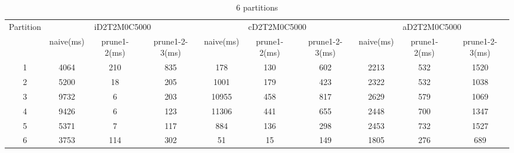 
\vspace*{50pt}
\begin{table*}[t]
  \centering
\makeatletter
    \long{}
\makeatother
  \caption{6 partitions}
    \vspace*{3pt}
  \footnotesize

  \label{table:partition6}
  \begin{tabular}{|c||c|c|c|c|c|c|c|c|c|}
  \hline
  \multirow{2}{*}{Partition} &  \multicolumn{3}{|c|}{iD2T2M0C5000} & \multicolumn{3}{|c|}{cD2T2M0C5000} &\multicolumn{3}{|c|}{aD2T2M0C5000} \\\cline{2-10}
    &  naive(ms) & prune1-2(ms) & prune1-2-3(ms) & naive(ms) & prune1-2(ms) & prune1-2-3(ms) & naive(ms) & prune1-2(ms) & prune1-2-3(ms) \\\hline \hline

\cline{2-10}
    1 &  4064 & 210 & 835 & 178 & 130 & 602 & 2213  & 532 & 1520 \\\hline

\cline{2-10}
    2 &  5200 & 18 & 205 & 1001 & 179 & 423 & 2322 & 532 & 1038 \\\hline

\cline{2-10}
    3 &  9732 & 6 & 203 & 10955 &  458 & 817 & 2629 & 579 & 1069 \\\hline
    
\cline{2-10}
    4 &  9426 & 6 & 123 & 11306 &  441& 655 & 2448 & 700 & 1347 \\\hline
    
\cline{2-10}
    5 &  5371 & 7 & 117 & 884 &  136 & 298 & 2453 & 732 & 1527 \\\hline
    
\cline{2-10}
    6 &  3753 & 114 & 302 & 51 & 15 & 149 & 1805 & 276 & 689 \\\hline

  \end{tabular}
  \vspace*{-17pt}
\end{table*}


